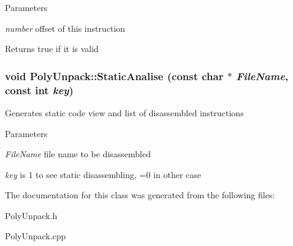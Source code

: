 \begin{DoxyParams}{Parameters}
\item[{\em number}]offset of this instruction \end{DoxyParams}
\begin{DoxyReturn}{Returns}
true if it is valid 
\end{DoxyReturn}
\hypertarget{classPolyUnpack_a3940f19400e857be686db4fe3789714b}{
\subsubsection[{StaticAnalise}]{\setlength{\rightskip}{0pt plus 5cm}void PolyUnpack::StaticAnalise (const char $\ast$ {\em FileName}, \/  const int {\em key})}}
\label{classPolyUnpack_a3940f19400e857be686db4fe3789714b}
Generates static code view and list of disassembled instructions 
\begin{DoxyParams}{Parameters}
\item[{\em FileName}]file name to be disassembled \item[{\em key}]is 1 to see static disassembling, =0 in other case \end{DoxyParams}


The documentation for this class was generated from the following files:\begin{DoxyCompactItemize}
\item 
PolyUnpack.h\item 
PolyUnpack.cpp\end{DoxyCompactItemize}
